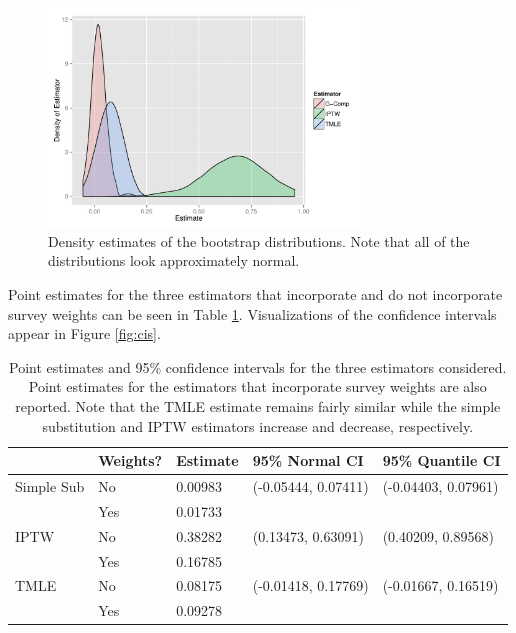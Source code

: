 \documentclass{article}
\begin{document}
\begin{figure}
\centering
\includegraphics[width=0.75\textwidth]{figures/naiveBootstrapDensities.pdf}
\caption{Density estimates of the bootstrap distributions. Note that all of the distributions look approximately normal.}
\label{fig:boot.distr}
\end{figure}

Point estimates for the three estimators that incorporate and do not incorporate survey weights can be seen in Table \ref{tab:ests}. Visualizations of the confidence intervals appear in Figure \ref{fig:cis}.

\begin{table}
\begin{tabular}{| l| l | l | l | l |}
  \hline
 & Weights? & Estimate & 95\% Normal CI & 95\% Quantile CI \\ 
  \hline
Simple Sub & No & 0.00983 & (-0.05444, 0.07411) & (-0.04403, 0.07961) \\ 
& Yes & 0.01733 & & \\
\hline
  IPTW & No & 0.38282 & (0.13473, 0.63091) & (0.40209, 0.89568) \\ 
& Yes & 0.16785 & & \\
\hline
  TMLE & No & 0.08175 & (-0.01418, 0.17769) & (-0.01667, 0.16519) \\ 
& Yes & 0.09278 & & \\
   \hline
\end{tabular}
\caption{Point estimates and 95\% confidence intervals for the three estimators considered. Point estimates for the estimators that incorporate survey weights are also reported. Note that the TMLE estimate remains fairly similar while the simple substitution and IPTW estimators increase and decrease, respectively.}
\label{tab:ests}
\end{table}
\end{document}

